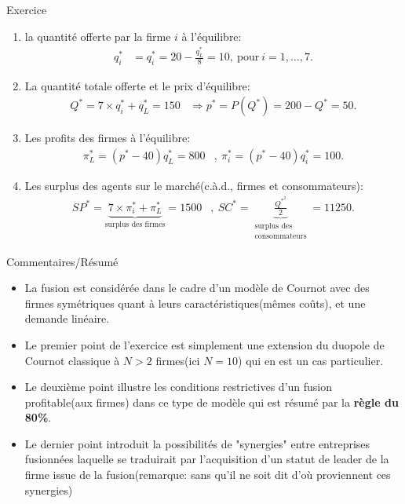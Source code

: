 \begin{frame}[allowframebreaks]{Exercice}
\begin{enumerate}
\begin{enumerate}[$\star$]
\begin{enumerate}[$\star$]
               \item la quantité offerte par la firme $i$ à l'équilibre: 
               \begin{align*}
                q_i^* &= q_i^* = 20 -\frac{q_L^*}{8} = 10, \ \text{pour} \ i=1, \ldots, 7.
               \end{align*}
               \item La quantité totale offerte et le prix d'équilibre:
               \begin{align*}
                Q^* = 7\times q_i^* + q_L^* = 150 &\Rightarrow p^* = P(Q^*) = 200-Q^* = 50.
               \end{align*}
               \item Les profits des firmes à l'équilibre:
               \begin{align*}
               \pi_L^* = (p^* - 40)q_L^* = 800&, \ \pi_i^* = (p^* - 40)q_i^* = 100.
               \end{align*}
               \item  Les surplus des agents sur le marché(c.à.d., firmes et consommateurs):
               \begin{align*}
                   SP^* = \underbrace{7\times \pi_i^* + \pi_L^*}_{\text{surplus des firmes}} = 1500&, \ 
                   SC^* =  \underbrace{\frac{Q^{*^2}}{2}}_{\substack{\text{surplus des }\\
                   \text{consommateurs}}} = 11250.
               \end{align*}
            
             \end{enumerate}

            \end{enumerate}
            \end{enumerate}    
\end{frame}
    \begin{frame}[allowframebreaks]{Commentaires/Résumé}
    \begin{itemize}
        \item La fusion est considérée dans le cadre d'un modèle de Cournot avec des firmes
         symétriques quant à leurs caractéristiques(mêmes coûts), et une demande linéaire. 
        \item Le premier point de l'exercice est simplement une extension du duopole 
        de Cournot classique à $N>2$ firmes(ici $N = 10$) qui en est un cas particulier. 
        \item Le deuxième point illustre les conditions restrictives 
        d'un fusion profitable(aux firmes) dans ce type de modèle qui est résumé par la \textbf{règle du 80\%}. 
        \item Le dernier point introduit la possibilités de "synergies" entre 
        entreprises fusionnées laquelle se traduirait par l'acquisition d'un 
        statut de leader de la firme issue de la fusion(remarque: 
        sans qu'il ne soit dit d'où proviennent ces synergies)
    \end{itemize}
    \end{frame}
